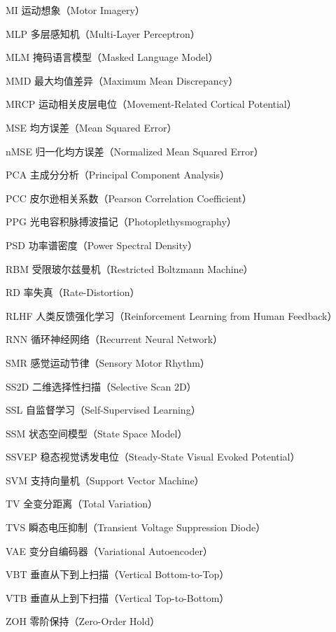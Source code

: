 \begin{denotation}
\item[MI] 运动想象（Motor Imagery）
\item[MLP] 多层感知机（Multi-Layer Perceptron）
\item[MLM] 掩码语言模型（Masked Language Model）
\item[MMD] 最大均值差异（Maximum Mean Discrepancy）
\item[MRCP] 运动相关皮层电位（Movement-Related Cortical Potential）
\item[MSE] 均方误差（Mean Squared Error）
\item[nMSE] 归一化均方误差（Normalized Mean Squared Error）
\item[PCA] 主成分分析（Principal Component Analysis）
\item[PCC] 皮尔逊相关系数（Pearson Correlation Coefficient）
\item[PPG] 光电容积脉搏波描记（Photoplethysmography）
\item[PSD] 功率谱密度（Power Spectral Density）
\item[RBM] 受限玻尔兹曼机（Restricted Boltzmann Machine）
\item[RD] 率失真（Rate-Distortion）
\item[RLHF] 人类反馈强化学习（Reinforcement Learning from Human Feedback）
\item[RNN] 循环神经网络（Recurrent Neural Network）
\item[SMR] 感觉运动节律（Sensory Motor Rhythm）
\item[SS2D] 二维选择性扫描（Selective Scan 2D）
\item[SSL] 自监督学习（Self-Supervised Learning）
\item[SSM] 状态空间模型（State Space Model）
\item[SSVEP] 稳态视觉诱发电位（Steady-State Visual Evoked Potential）
\item[SVM] 支持向量机（Support Vector Machine）
\item[TV] 全变分距离（Total Variation）
\item[TVS] 瞬态电压抑制（Transient Voltage Suppression Diode）
\item[VAE] 变分自编码器（Variational Autoencoder）
\item[VBT] 垂直从下到上扫描（Vertical Bottom-to-Top）
\item[VTB] 垂直从上到下扫描（Vertical Top-to-Bottom）
\item[ZOH] 零阶保持（Zero-Order Hold）

\end{denotation}